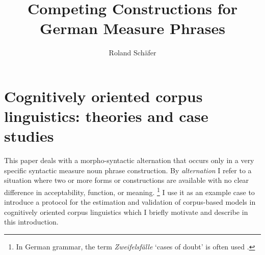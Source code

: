 \documentclass[USenglish]{article}
\begin{document}

  \author*[1]{Roland Schäfer}
  \title{Competing Constructions for German Measure Phrases}


  
\maketitle

\section{Cognitively oriented corpus linguistics: theories and case studies}
\label{sec:cogocl}

This paper deals with a morpho-syntactic alternation that occurs only in a very specific syntactic measure noun phrase construction.
By \textit{alternation} I refer to a situation where two or more forms or constructions are available with no clear difference in acceptability, function, or meaning.%
\footnote{In German grammar, the term \textit{Zweifelsfälle} `cases of doubt' is often used \citep{Klein2009}.}
I use it as an example case to introduce a protocol for the estimation and validation of corpus-based models in cognitively oriented corpus linguistics which I briefly motivate and describe in this introduction.


\end{document}
